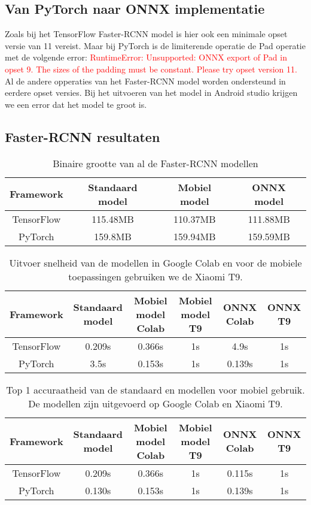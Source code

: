 \subsection{Van PyTorch naar ONNX implementatie}
Zoals bij het TensorFlow Faster-RCNN model is hier ook een minimale opset versie van 11 vereist.
Maar bij PyTorch is de limiterende operatie de Pad operatie met de volgende error: 
\textcolor{red}{RuntimeError: Unsupported: ONNX export of Pad in opset 9. The sizes of the padding must be constant. Please try opset version 11.}
Al de andere opperaties van het Faster-RCNN model worden ondersteund in eerdere opset versies.
Bij het uitvoeren van het model in Android studio krijgen we een error dat het model te groot is.

\subsection{Faster-RCNN resultaten}

\begin{table}[!ht]
    \caption{Binaire grootte van al de Faster-RCNN modellen}
\begin{tabular}{cccc}
    \hline
    Framework & Standaard model & Mobiel model & ONNX model \\
    \hline
    TensorFlow & 115.48MB & 110.37MB & 111.88MB \\
    PyTorch & 159.8MB & 159.94MB & 159.59MB \\
    \hline
\end{tabular}
\label{tab:rcnn_size}
\end{table}

\begin{table}[!ht]
    \caption{Uitvoer snelheid van de modellen in Google Colab en voor de mobiele toepassingen gebruiken we de Xiaomi T9.}
\begin{tabular}{cccccc}
    \hline
    Framework & Standaard model & Mobiel model Colab & Mobiel model T9 & ONNX Colab & ONNX T9\\
    \hline
    TensorFlow & 0.209s & 0.366s & 1s & 4.9s & 1s \\
    PyTorch & 3.5s & 0.153s & 1s & 0.139s & 1s \\
    \hline
\end{tabular}
\label{tab:rcnn_speed}
\end{table}

\begin{table}[!ht]
    \caption{Top 1 accuraatheid van de standaard en modellen voor mobiel gebruik. De modellen zijn uitgevoerd op Google Colab en Xiaomi T9.}
\begin{tabular}{cccccc}
    \hline
    Framework & Standaard model & Mobiel model Colab & Mobiel model T9 & ONNX Colab & ONNX T9\\
    \hline
    TensorFlow & 0.209s & 0.366s & 1s & 0.115s & 1s \\
    PyTorch & 0.130s & 0.153s & 1s & 0.139s & 1s \\
    \hline
\end{tabular}
\label{tab:rcnn_acc}
\end{table}


